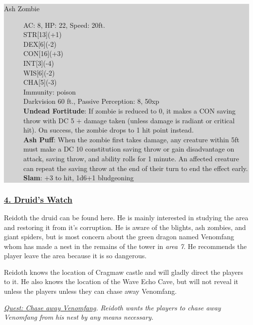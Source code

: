 \colorbox{lightgray}{\begin{minipage}{0.4\textwidth}
		\begin{description}
			\item[Ash Zombie]
			AC: 8, HP: 22, Speed: 20ft.
			\\ STR[13](+1) 
			\\ DEX[6](-2)
			\\ CON[16](+3)
			\\ INT[3](-4)
			\\ WIS[6](-2)
			\\ CHA[5](-3) 
			\\ Immunity: poison
			\\ Darkvision 60 ft., Passive Perception: 8, 50xp
			\\ \textbf{Undead Fortitude}: If zombie is reduced to 0, it makes a CON saving throw with DC 5 + damage taken (unless damage is radiant or critical hit). On success, the zombie drops to 1 hit point instead.
			\\ \textbf{Ash Puff}: When the zombie first takes damage, any creature within 5ft must make a DC 10 constitution saving throw or gain disadvantage on attack, saving throw, and ability rolls for 1 minute. An affected creature can repeat the saving throw at the end of their turn to end the effect early. 
			\\ \textbf{Slam}: +3 to hit, 1d6+1 bludgeoning
		\end{description}
\end{minipage}}
\break

\subsubsection*{\underline{4. Druid's Watch}}
Reidoth the druid can be found here. He is mainly interested in studying the area and restoring it from it's corruption. He is aware of the blights, ash zombies, and giant spiders, but is most concern about the green dragon named Venomfang whom has made a nest in the remains of the tower in \emph{area 7}. He recommends the player leave the area because it is so dangerous.

Reidoth knows the location of Cragmaw castle and will gladly direct the players to it. He also knows the location of the Wave Echo Cave, but will not reveal it unless the players unless they can chase away Venomfang. 

\emph{\underline{Quest: Chase away Venomfang}. Reidoth wants the players to chase away Venomfang from his nest by any means necessary. }

